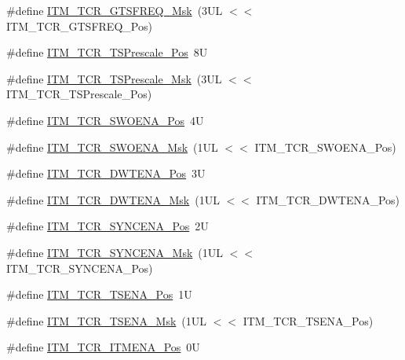 \begin{DoxyCompactItemize}
\item 
\#define \hyperlink{group___c_m_s_i_s___i_t_m_gade862cf009827f7f6748fc44c541b067}{I\+T\+M\+\_\+\+T\+C\+R\+\_\+\+G\+T\+S\+F\+R\+E\+Q\+\_\+\+Msk}~(3\+U\+L $<$$<$ I\+T\+M\+\_\+\+T\+C\+R\+\_\+\+G\+T\+S\+F\+R\+E\+Q\+\_\+\+Pos)
\item 
\#define \hyperlink{group___c_m_s_i_s___i_t_m_gad7bc9ee1732032c6e0de035f0978e473}{I\+T\+M\+\_\+\+T\+C\+R\+\_\+\+T\+S\+Prescale\+\_\+\+Pos}~8U
\item 
\#define \hyperlink{group___c_m_s_i_s___i_t_m_ga7a723f71bfb0204c264d8dbe8cc7ae52}{I\+T\+M\+\_\+\+T\+C\+R\+\_\+\+T\+S\+Prescale\+\_\+\+Msk}~(3\+U\+L $<$$<$ I\+T\+M\+\_\+\+T\+C\+R\+\_\+\+T\+S\+Prescale\+\_\+\+Pos)
\item 
\#define \hyperlink{group___c_m_s_i_s___i_t_m_ga7a380f0c8078f6560051406583ecd6a5}{I\+T\+M\+\_\+\+T\+C\+R\+\_\+\+S\+W\+O\+E\+N\+A\+\_\+\+Pos}~4U
\item 
\#define \hyperlink{group___c_m_s_i_s___i_t_m_ga97476cb65bab16a328b35f81fd02010a}{I\+T\+M\+\_\+\+T\+C\+R\+\_\+\+S\+W\+O\+E\+N\+A\+\_\+\+Msk}~(1\+U\+L $<$$<$ I\+T\+M\+\_\+\+T\+C\+R\+\_\+\+S\+W\+O\+E\+N\+A\+\_\+\+Pos)
\item 
\#define \hyperlink{group___c_m_s_i_s___i_t_m_ga30e83ebb33aa766070fe3d1f27ae820e}{I\+T\+M\+\_\+\+T\+C\+R\+\_\+\+D\+W\+T\+E\+N\+A\+\_\+\+Pos}~3U
\item 
\#define \hyperlink{group___c_m_s_i_s___i_t_m_ga98ea1c596d43d3633a202f9ee746cf70}{I\+T\+M\+\_\+\+T\+C\+R\+\_\+\+D\+W\+T\+E\+N\+A\+\_\+\+Msk}~(1\+U\+L $<$$<$ I\+T\+M\+\_\+\+T\+C\+R\+\_\+\+D\+W\+T\+E\+N\+A\+\_\+\+Pos)
\item 
\#define \hyperlink{group___c_m_s_i_s___i_t_m_gaa93a1147a39fc63980d299231252a30e}{I\+T\+M\+\_\+\+T\+C\+R\+\_\+\+S\+Y\+N\+C\+E\+N\+A\+\_\+\+Pos}~2U
\item 
\#define \hyperlink{group___c_m_s_i_s___i_t_m_gac89b74a78701c25b442105d7fe2bbefb}{I\+T\+M\+\_\+\+T\+C\+R\+\_\+\+S\+Y\+N\+C\+E\+N\+A\+\_\+\+Msk}~(1\+U\+L $<$$<$ I\+T\+M\+\_\+\+T\+C\+R\+\_\+\+S\+Y\+N\+C\+E\+N\+A\+\_\+\+Pos)
\item 
\#define \hyperlink{group___c_m_s_i_s___i_t_m_ga5aa381845f810114ab519b90753922a1}{I\+T\+M\+\_\+\+T\+C\+R\+\_\+\+T\+S\+E\+N\+A\+\_\+\+Pos}~1U
\item 
\#define \hyperlink{group___c_m_s_i_s___i_t_m_ga436b2e8fa24328f48f2da31c00fc9e65}{I\+T\+M\+\_\+\+T\+C\+R\+\_\+\+T\+S\+E\+N\+A\+\_\+\+Msk}~(1\+U\+L $<$$<$ I\+T\+M\+\_\+\+T\+C\+R\+\_\+\+T\+S\+E\+N\+A\+\_\+\+Pos)
\item 
\#define \hyperlink{group___c_m_s_i_s___i_t_m_ga3286b86004bce7ffe17ee269f87f8d9d}{I\+T\+M\+\_\+\+T\+C\+R\+\_\+\+I\+T\+M\+E\+N\+A\+\_\+\+Pos}~0U

\end{DoxyCompactItemize}
